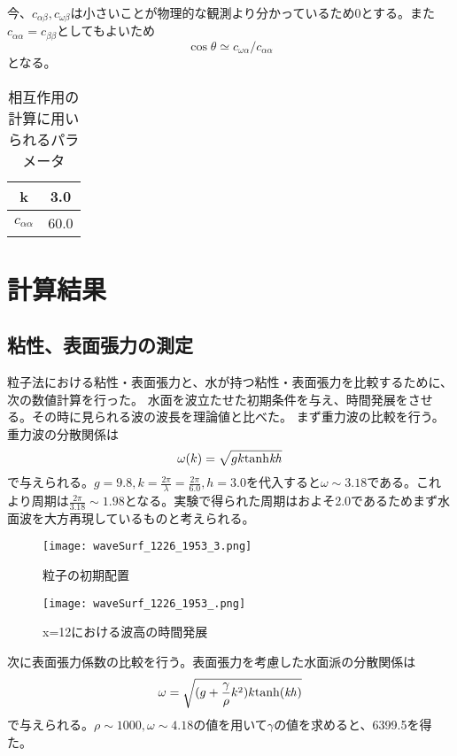 \documentclass[]{jsarticle}
\begin{document}
今、$c_{\alpha\beta},c_{\omega\beta}$は小さいことが物理的な観測より分かっているため0とする。また$c_{\alpha\alpha}=c_{\beta\beta}$としてもよいため
\begin{equation}
\cos\theta\simeq c_{\omega\alpha}/c_{\alpha\alpha}
\end{equation}
となる。
\begin{table}[h]
  \caption{相互作用の計算に用いられるパラメータ}
  \label{interParam}
  \begin{center}
    \begin{tabular}{|c|c|}\hline
      k&3.0 \\ \hline
      $c_{\alpha\alpha}$ & 60.0 \\ \hline
    \end{tabular}
  \end{center}  
\end{table}

\newpage
\section{計算結果}
\subsection{粘性、表面張力の測定}
粒子法における粘性・表面張力と、水が持つ粘性・表面張力を比較するために、次の数値計算を行った。
水面を波立たせた初期条件を与え、時間発展をさせる。その時に見られる波の波長を理論値と比べた。
まず重力波の比較を行う。重力波の分散関係は
\begin{equation}
  \omega(k)=\sqrt{gk\rm{tanh}\it{kh}}
\end{equation}
で与えられる\cite{tatsumiKiso}。$g=9.8, k=\frac{2\pi}{\lambda}=\frac{2\pi}{6.0}, h=3.0$を代入すると$\omega\sim3.18$である。これより周期は$\frac{2\pi}{3.18}\sim1.98$となる。実験で得られた周期はおよそ2.0であるためまず水面波を大方再現しているものと考えられる。
\begin{figure}[H]
  \centering
  \texttt{[image: waveSurf\_1226\_1953\_3.png]}
  \caption{粒子の初期配置}
  \label{fig:waveSurfInit}
\end{figure}
\begin{figure}[H]
  \centering
  \texttt{[image: waveSurf\_1226\_1953\_.png]}
  \caption{x=12における波高の時間発展}
  \label{fig:waveSurfEvol}
\end{figure}


次に表面張力係数の比較を行う。表面張力を考慮した水面派の分散関係は
\begin{equation}
\omega=\sqrt{(g+\frac{\gamma}{\rho}k^2)k\rm{tanh}(\it{kh})}
\end{equation}
で与えられる\cite{tatsumiKiso}。$\rho\sim1000, \omega\sim4.18$の値を用いて$\gamma$の値を求めると、6399.5を得た。
\end{document}
